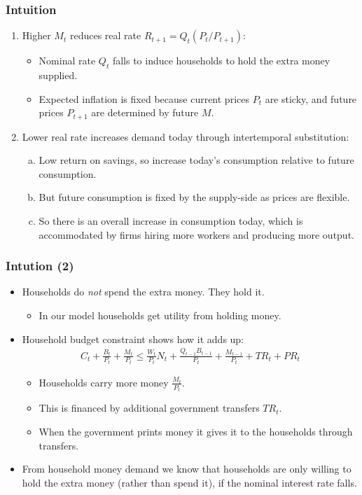 \documentclass[english,xcolor=svgnames]{beamer}
\begin{document}
\begin{frame}
\frametitle{Intuition
}
\begin{enumerate}[1.]
	\item Higher $M_t$ reduces real rate $R_{t+1}=Q_t (P_t/P_{t+1})$:
	\begin{itemize}
		\item Nominal rate $Q_t$ falls to induce households to hold the extra money supplied.
		\item Expected inflation is fixed because current prices $P_t$ are sticky, and future prices $P_{t+1}$ are determined by future $M$.
	\end{itemize}
	\item Lower real rate increases demand today through intertemporal substitution:
	\begin{enumerate}[(a)]
		\item Low return on savings, so increase today's consumption relative to future consumption.
		\item But future consumption is fixed by the supply-side as prices are flexible.
		\item So there is an overall increase in consumption today, which is accommodated by firms hiring more workers and producing more output.
	\end{enumerate}
\end{enumerate}
\end{frame}


\begin{frame}
	\frametitle{Intution (2)
	}
	\begin{itemize}
		\item Households do \emph{not} spend the extra money. They hold it.
		\begin{itemize}
			\item In our model households get utility from holding money.
		\end{itemize}
		\item Household budget constraint shows how it adds up:
		\begin{align*}
			C_t + \frac{B_{t}}{P_t}  + \frac{M_t}{P_t}  \le \frac{W_t}{P_t} N_t +  \frac{Q_{t-1}B_{t-1}}{P_t} + \frac{M_{t-1}}{P_t} + TR_t+PR_t
		\end{align*}
		\begin{itemize}
			\item Households carry more money $\frac{M_t}{P_t}$.
			\item This is financed by additional government transfers $TR_t$.
			\item When the government prints money it gives it to the households through transfers.
		\end{itemize}
		\item From household money demand we know that households are only willing to hold the extra money (rather than spend it), if the nominal interest rate falls.
	\end{itemize}
	\end{frame}
	
\end{document}

